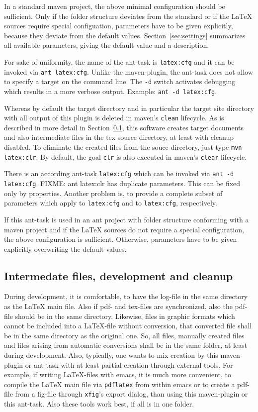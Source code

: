 \documentclass[12pt]{article}
\begin{document}
In a standard maven project, 
the above minimal configuration should be sufficient. 
Only if the folder structure deviates from the standard 
or if the \LaTeX{} sources require special configuation, 
parameters have to be given explicitly, 
because they deviate from the default values. 
Section~\ref{sec:settings} summarizes all available parameters, 
giving the default value and a description. 


For sake of uniformity, 
the name of the ant-task is {\tt latex:cfg} 
and it can be invoked via {\tt ant latex:cfg}. 
Unlike the maven-plugin, the ant-task 
does not allow to specify a target on the command line. 
The {\tt -d} switch activates debugging 
which results in a more verbose output. 
Example: {\tt ant -d latex:cfg}. 

Whereas by default the target directory and in particular 
the target site directory with all output of this plugin is deleted 
in maven's {\tt clean} lifecycle. 
As is described in more detail in Section~\ref{subsec:devel}, 
this software creates target documents and also intermediate files 
in the tex source directory, at least with cleanup disabled. 
To eliminate the created files from the souce directory, 
just type {\tt mvn latex:clr}. 
By default, the goal {\tt clr} 
is also executed in maven's {\tt clear} lifecycle. 

There is an according ant-task {\tt latex:cfg} 
which can be invoked via {\tt ant -d latex:cfg}. 
FIXME: ant latex:clr has duplicate parameters. 
This can be fixed only by properties. 
Another problem is, to provide a complete subset of parameters 
which apply to {\tt latex:cfg} and to {\tt latex:cfg}, respectively. 

If this ant-task is used in an ant project 
with folder structure conforming with a maven project 
and if the \LaTeX{} sources do not require a special configuration, 
the above configuration is sufficient. 
Otherwise, parameters have to be given explicitly 
overwriting the default values. 

\subsection{Intermedate files, development and cleanup}\label{subsec:devel}

During development, it is comfortable, 
to have the log-file in the same directory as the \LaTeX{} main file. 
Also if pdf- and tex-files are synchronized, 
also the pdf-file should be in the same directory. 
Likewise, files in graphic formats 
which cannot be included into a \LaTeX-file without conversion, 
that converted file shall be in the same directory as the original one. 
So, all files, manually created files 
and files arising from automatic conversions 
shall be in the same folder, at least during development. 
Also, typically, one wants to mix creation by this maven-plugin or ant-task 
with at least partial creation through external tools. 
For example, if writing \LaTeX-files with emacs, 
it is much more convenient, to compile the \LaTeX{} main file 
via {\tt pdflatex} from within emacs 
or to create a pdf-file from a \gls{fig}-file 
through {\tt xfig}'s export dialog, 
than using this maven-plugin or this ant-task. 
Also these tools work best, if all is in one folder. 
\end{document}
